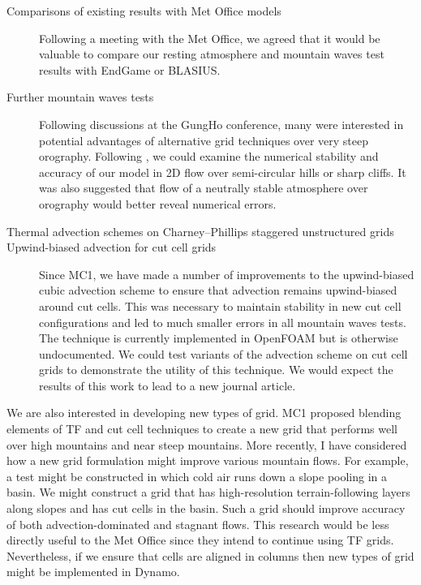 \documentclass[a4paper]{article}
\begin{document}
\begin{description}
	\item[Comparisons of existing results with Met Office models]{Following a meeting with the Met Office, we agreed that it would be valuable to compare our resting atmosphere and mountain waves test results with EndGame or BLASIUS.}
	\item[Further mountain waves tests]{Following discussions at the GungHo conference, many were interested in potential advantages of alternative grid techniques over very steep orography.  Following \citet{yamazaki-satomura2010}, we could examine the numerical stability and accuracy of our model in 2D flow over semi-circular hills or sharp cliffs.  It was also suggested that flow of a neutrally stable atmosphere over orography would better reveal numerical errors.}
	\item[Thermal advection schemes on Charney--Phillips staggered unstructured grids]{}
	\item[Upwind-biased advection for cut cell grids]{Since MC1, we have made a number of improvements to the upwind-biased cubic advection scheme to ensure that advection remains upwind-biased around cut cells.  This was necessary to maintain stability in new cut cell configurations and led to much smaller errors in all mountain waves tests.  The technique is currently implemented in OpenFOAM but is otherwise undocumented.  We could test variants of the advection scheme on cut cell grids to demonstrate the utility of this technique.  We would expect the results of this work to lead to a new journal article.}
\end{description}

We are also interested in developing new types of grid.  MC1 proposed blending elements of TF and cut cell techniques to create a new grid that performs well over high mountains and near steep mountains.  More recently, I have considered how a new grid formulation might improve various mountain flows.  For example, a test might be constructed in which cold air runs down a slope pooling in a basin.  We might construct a grid that has high-resolution terrain-following layers along slopes and has cut cells in the basin.  Such a grid should improve accuracy of both advection-dominated and stagnant flows.
This research would be less directly useful to the Met Office since they intend to continue using TF grids.  Nevertheless, if we ensure that cells are aligned in columns then new types of grid might be implemented in Dynamo.
\end{document}
